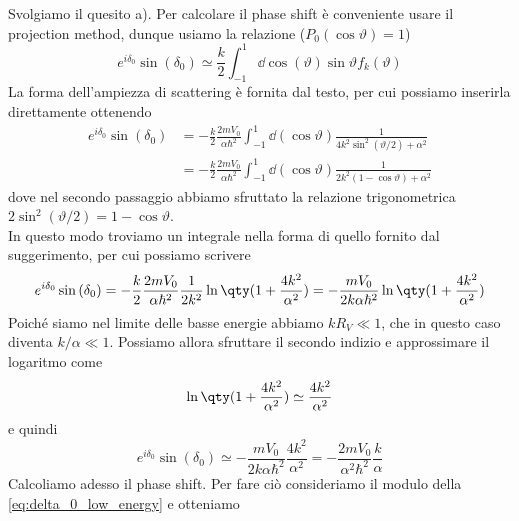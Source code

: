 \begin{soluzione}
   Svolgiamo il quesito a). Per calcolare il phase shift è conveniente usare il projection method, dunque usiamo la relazione ($P_0(\cos{\vartheta})=1$)
   \begin{equation*}
      e^{i \delta_0} \sin{(\delta_0)}
      \simeq \frac{k}{2} \int_{-1}^{1} \dd{\cos{(\vartheta)}} \sin{\vartheta} f_k(\vartheta)
   \end{equation*}
   La forma dell'ampiezza di scattering è fornita dal testo, per cui possiamo inserirla direttamente ottenendo
   \begin{equation*}
      \begin{split}
         e^{i \delta_0} \sin{(\delta_0)}
         & =-\frac{k}{2} \frac{2m V_0}{\alpha \hbar^2} \int_{-1}^{1} \dd{(\cos{\vartheta})} \frac{1}{4k^2 \sin^2{( \vartheta/2 )} + \alpha^2}
         \\
         & =-\frac{k}{2} \frac{2m V_0}{\alpha \hbar^2} \int_{-1}^{1} \dd{(\cos{\vartheta})} \frac{1}{2k^2 ( 1 - \cos{\vartheta}) + \alpha^2}
      \end{split}
   \end{equation*}
   dove nel secondo passaggio abbiamo sfruttato la relazione trigonometrica $2 \sin^2{( \vartheta/2 )}=1 - \cos{\vartheta}$.\\
   In questo modo troviamo un integrale nella forma di quello fornito dal suggerimento, per cui possiamo scrivere
   \begin{equation*}
      e^{i \delta_0} \sin{(\delta_0)}
      =-\frac{k}{2} \frac{2m V_0}{\alpha \hbar^2} \frac{1}{2k^2} \ln\qty( 1 + \frac{4k^2}{\alpha^2} )
      =-\frac{m V_0}{2 k \alpha \hbar^2} \ln\qty( 1 + \frac{4k^2}{\alpha^2} )
   \end{equation*}
   Poiché siamo nel limite delle basse energie abbiamo $kR_V \ll 1$, che in questo caso diventa $k/\alpha \ll 1$. Possiamo allora sfruttare il secondo indizio e approssimare il logaritmo come
   \begin{equation*}
      \ln\qty( 1 + \frac{4k^2}{\alpha^2} )
      \simeq \frac{4k^2}{\alpha^2}
   \end{equation*}
   e quindi
   \begin{equation*}
      e^{i \delta_0} \sin{(\delta_0)}
      \simeq -\frac{m V_0}{2 k \alpha \hbar^2} \frac{4k^2}{\alpha^2}
      =-\frac{2 m V_0}{\alpha^2 \hbar^2} \frac{k}{\alpha}
      \label{eq:delta_0_low_energy}
   \end{equation*}
   Calcoliamo adesso il phase shift. Per fare ciò consideriamo il modulo della \eqref{eq:delta_0_low_energy} e otteniamo

\end{soluzione}
